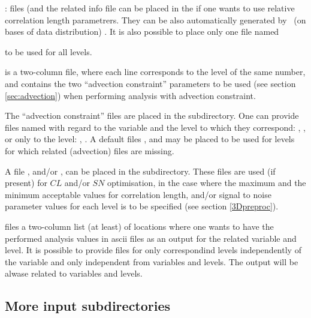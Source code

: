 \underline{}: files (and the related info file  can be placed in the \linebreak {} if one wants to use relative correlation length parametrers. They can be also automatically generated by \diva\ (on bases of data distribution) . It is also possible to place only one file named { to be used for all levels.

\underline{} is a two-column file, where each line corresponds to the level of the same number, and contains the two ``advection constraint'' parameters to be used (see section \ref{sec:advection}) when performing analysis with advection constraint.

The ``advection constraint'' files are placed in the  subdirectory. One can provide files named with regard to the variable and the level to which they correspond: , , or only to the level: , . A default files ,  and  may be placed to be used for levels for which related (advection) files are missing.

A file \underline{}, and/or \underline{}, can be placed in the  subdirectory. These files are used (if present) for $CL$ and/or $SN$ optimisation, in the case where the maximum and the minimum acceptable values for correlation length, and/or signal to noise parameter values for each level is to be specified (see section \ref{3Dpreproc}).


\underline{} files a two-column list (at least) of locations where one wants to have the performed analysis values in ascii files as an output for the related variable and level. It is possible to provide files  for only correspondind levels independently of the variable and only  independent from variables and levels. The output will be alwase related to variables and levels.



\subsection{More  input subdirectories}


\subsubsection{}

}
